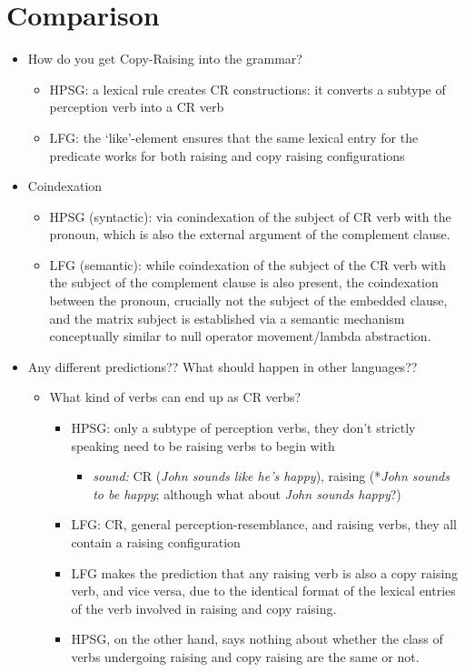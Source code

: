 \documentclass[11pt]{article}
\begin{document}
\section{Comparison}
\begin{itemize}
\item How do you get Copy-Raising into the grammar? \begin{itemize}
    \item HPSG: a lexical rule creates CR constructions: it converts a subtype of perception verb into a CR verb
    \item LFG: the `like'-element ensures that the same lexical entry for the predicate works for both raising and copy raising configurations
    \end{itemize}

\item Coindexation 
\begin{itemize}
    \item HPSG (syntactic): via conindexation of the subject of CR verb with the pronoun, which is also the external argument of the complement clause.
    \item LFG (semantic): while coindexation of the subject of the CR verb with the subject of the complement clause is also present, the coindexation between the pronoun, crucially not the subject of the embedded clause, and the matrix subject is established via a semantic mechanism conceptually similar to null operator movement/lambda abstraction.
\end{itemize}


\item Any different predictions?? What should happen in other languages?? \begin{itemize}
    \item  What kind of verbs can end up as CR verbs? \begin{itemize}
        \item HPSG: only a subtype of perception verbs, they don't strictly speaking need to be raising verbs to begin with \begin{itemize}
            \item \textit{sound:}  CR (\textit{John sounds like he's happy}),  raising (*\textit{John sounds to be happy}; although what about \textit{John sounds happy}?)
            \end{itemize}

        \item LFG: CR, general perception-resemblance, and raising verbs, they all contain a raising configuration
        \item LFG makes the prediction that any raising verb is also a copy raising verb, and vice versa, due to the identical format of the lexical entries of the verb involved in raising and copy raising.
        \item HPSG, on the other hand, says nothing about whether the class of verbs undergoing raising and copy raising are the same or not.
        \end{itemize}


\end{itemize}
\end{itemize}
\end{document}

